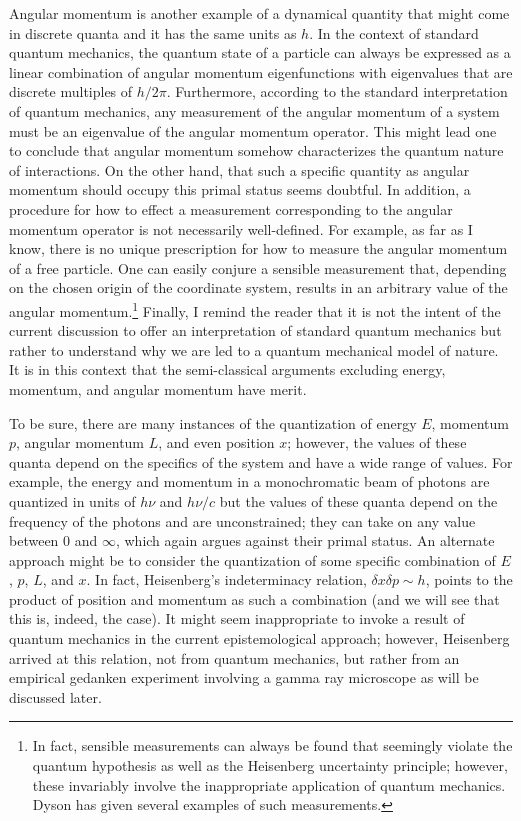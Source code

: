 \documentclass[12pt]{article}
\begin{document}
Angular momentum is another example of a dynamical quantity that might come in discrete quanta and it has the same units as $h$.  In the context of standard quantum mechanics, the quantum state of a particle can always be expressed as a linear combination of angular momentum eigenfunctions with eigenvalues that are discrete multiples of $h/2\pi$.  Furthermore, according to the standard interpretation of quantum mechanics, any measurement of the angular momentum of a system must be an eigenvalue of the angular momentum operator.  This might lead one to conclude that angular momentum somehow characterizes the quantum nature of interactions.  On the other hand, that such a specific quantity as angular momentum should occupy this primal status seems doubtful.  In addition, a procedure for how to effect a measurement corresponding to the angular momentum operator is not necessarily well-defined.  For example, as far as I know, there is no unique prescription for how to measure the angular momentum of a free particle.  One can easily conjure a sensible measurement that, depending on the chosen origin of the coordinate system, results in an arbitrary value of the angular momentum.\footnote{In fact, sensible measurements can always be found that seemingly violate the quantum hypothesis as well as the Heisenberg uncertainty principle; however, these invariably involve the inappropriate application of quantum mechanics.  Dyson \cite{Dy2002} has given several examples of such measurements.}  Finally, I remind the reader that it is not the intent of the current discussion to offer an interpretation of standard quantum mechanics but rather to understand why we are led to a quantum mechanical model of nature.  It is in this context that the semi-classical arguments excluding energy, momentum, and angular momentum have merit.

To be sure, there are many instances of the quantization of energy $E$, momentum $p$, angular momentum $L$, and even position $x$; however, the values of these quanta depend on the specifics of the system and have a wide range of values.  For example, the energy and momentum in a monochromatic beam of photons are quantized in units of $h\nu$ and $h\nu/c$ but the values of these quanta depend on the frequency of the photons and are unconstrained; they can take on any value between $0$ and $\infty$, which again argues against their primal status.  An alternate approach might be to consider the quantization of some specific combination of $E$, $p$, $L$, and $x$.  In fact, Heisenberg's indeterminacy relation\cite{He1927}, $\delta x \delta p \sim h$, points to the product of position and momentum as such a combination (and we will see that this is, indeed, the case).  It might seem inappropriate to invoke a result of quantum mechanics in the current epistemological approach; however, Heisenberg arrived at this relation, not from quantum mechanics, but rather from an empirical gedanken experiment involving a gamma ray microscope as will be discussed later.
\end{document}
